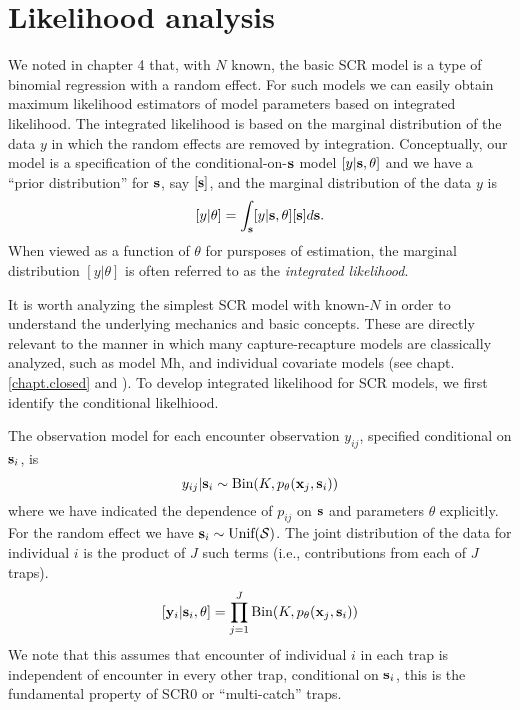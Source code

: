 \section{Likelihood analysis }

We noted in chapter 4 that, with $N$ known, the basic SCR model is a
type of binomial regression with a random effect. For such models we
can easily obtain maximum likelihood estimators of model parameters
based on integrated likelihood. The integrated likelihood is based on
the marginal distribution of the data $y$ in which the random effects
are removed by integration. Conceptually, our model is a specification
of the conditional-on-${\bf s}$ model $[y|{\bf s},\theta]$ and we have
a ``prior distribution'' for ${\bf s}$, say $[{\bf s}]$, and the
marginal distribution of the data $y$ is
\[
[y|\theta] =  \int_{\bf s} [y|{\bf s},\theta][{\bf s}] d{\bf s}.
\]
When viewed as a function of $\theta$ for pursposes of estimation, the
marginal distribution $[y|\theta]$ is often referred to as the {\it
  integrated likelihood}.

It is worth analyzing 
the simplest SCR model with known-$N$ in order to understand the
underlying mechanics and basic concepts. These are directly relevant to
the manner in which many capture-recapture models are classically
analyzed, such as model Mh, and individual covariate models (see
chapt. \ref{chapt.closed} and  \citet[][chapt. 6]{royle_dorazio:2008}). To develop integrated
likelihood for SCR models, we first identify the conditional
likelhiood. 

The observation model for each encounter observation $y_{ij}$,
specified conditional on ${\bf s}_{i}$, is 
\begin{equation}
	y_{ij}| {\bf s}_{i} \sim \mbox{Bin}(K, p_{\theta}({\bf x}_{j},{\bf s}_{i}))
\label{mle.eq.cond-on-s}
\end{equation}
where we have indicated the dependence of $p_{ij}$ on ${\bf s}$ and
parameters $\theta$
explicitly.
For the random effect we have ${\bf s}_{i} \sim  \mbox{Unif}({\cal
  S})$.
The joint distribution of the data for individual $i$ is the product
of $J$ such terms (i.e., contributions from each of $J$ traps).
\[
  [{\bf y}_{i} | {\bf s}_{i} , \theta] = 
  \prod_{j=1}^{J} \mbox{Bin}(K, p_{\theta}({\bf x}_{j},{\bf s}_{i}) )
\]
We note that this assumes that encounter of individual $i$ in each
trap is independent of encounter in every other trap, conditional on
${\bf s}_{i}$, this is the fundamental property of SCR0 or
``multi-catch'' traps. 

